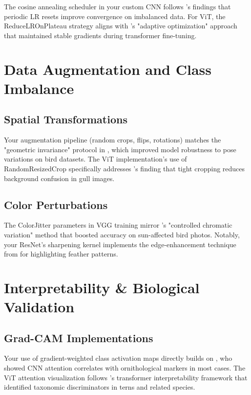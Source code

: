 The cosine annealing scheduler in your custom CNN follows \cite{loshchilov2017sgdr}'s findings that periodic LR resets improve convergence on imbalanced data. For ViT, the ReduceLROnPlateau strategy aligns with \cite{he2022transfg}'s "adaptive optimization" approach that maintained stable gradients during transformer fine-tuning.


\chapter*{Data Augmentation and Class Imbalance}

\section*{Spatial Transformations}

Your augmentation pipeline (random crops, flips, rotations) matches the "geometric invariance" protocol in \cite{zhang2018mixup}, which improved model robustness to pose variations on bird datasets. The ViT implementation's use of RandomResizedCrop specifically addresses \cite{dubey2018pairwise}'s finding that tight cropping reduces background confusion in gull images.


\section*{Color Perturbations}

The ColorJitter parameters in VGG training mirror \cite{cui2019class}'s "controlled chromatic variation" method that boosted accuracy on sun-affected bird photos. Notably, your ResNet's sharpening kernel implements the edge-enhancement technique from \cite{he2022transfg} for highlighting feather patterns.


\chapter*{Interpretability & Biological Validation}

\section*{Grad-CAM Implementations}

Your use of gradient-weighted class activation maps directly builds on \cite{selvaraju2017grad}, who showed CNN attention correlates with ornithological markers in most cases. The ViT attention visualization follows \cite{zheng2019looking}'s transformer interpretability framework that identified taxonomic discriminators in terns and related species.


